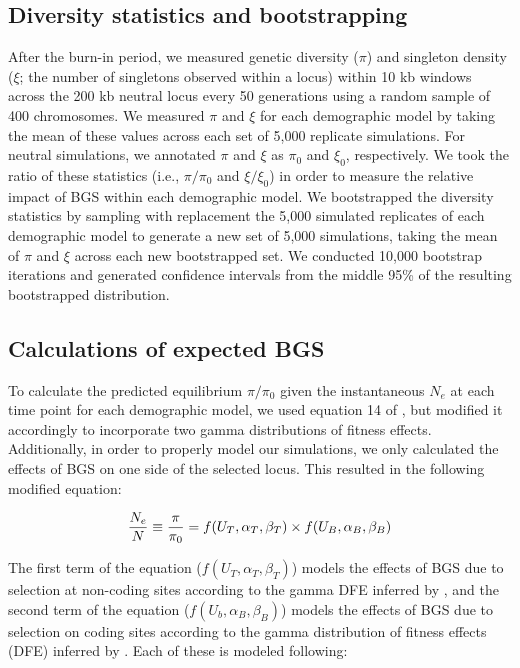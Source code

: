 \documentclass[9pt,twocolumn,twoside]{rilabRxiv}
\begin{document}
\subsection{Diversity statistics and bootstrapping}

After the burn-in period, we measured genetic diversity ($\pi$) and singleton density ($\xi$; the number of singletons observed within a locus) within 10 kb windows across the 200 kb neutral locus every 50 generations using a random sample of 400 chromosomes.
We measured $\pi$ and $\xi$ for each demographic model by taking the mean of these values across each set of 5,000 replicate simulations.
For neutral simulations, we annotated $\pi$ and $\xi$ as $\pi_0$ and $\xi_0$, respectively.
We took the ratio of these statistics (i.e., $\pi/\pi_0$ and $\xi/\xi_0$) in order to measure the relative impact of BGS within each demographic model.
We bootstrapped the diversity statistics by sampling with replacement the 5,000 simulated replicates of each demographic model to generate a new set of 5,000 simulations, taking the mean of $\pi$ and $\xi$ across each new bootstrapped set.
We conducted 10,000 bootstrap iterations and generated confidence intervals from the middle 95\% of the resulting bootstrapped distribution.

\subsection{Calculations of expected BGS}

To calculate the predicted equilibrium $\pi/\pi_0$ given the instantaneous $N_e$ at each time point for each demographic model, we used equation 14 of \citet{nordborg1996effect}, but modified it accordingly to incorporate two gamma distributions of fitness effects.
Additionally, in order to properly model our simulations, we only calculated the effects of BGS on one side of the selected locus.
This resulted in the following modified equation:


\begin{equation*}
    \frac{N_e}{N}\equiv\frac{\pi}{\pi_0}=f(U_T,\alpha_T,\beta_T)\times f(U_B,\alpha_B,\beta_B) \\
\end{equation*}
    
The first term of the equation ($f(U_T,\alpha_T,\beta_T)$) models the effects of BGS due to selection at non-coding sites according to the gamma DFE inferred by \citet{torgerson2009evolutionary}, and the second term of the equation ($f(U_b,\alpha_B,\beta_B)$) models the effects of BGS due to selection on coding sites according to the gamma distribution of fitness effects (DFE) inferred by \citet{boyko2008assessing}.
Each of these is modeled following:
\end{document}
